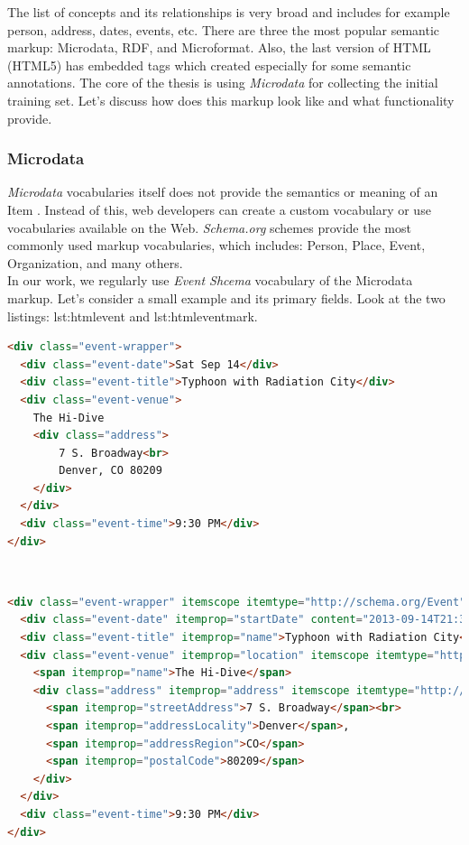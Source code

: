 The list of concepts and its relationships is very broad and includes for example person, address, dates, events, etc. There are three the most popular semantic markup: Microdata, RDF, and Microformat. Also, the last version of HTML (HTML5) has embedded tags which created especially for some semantic annotations. The core of the thesis is using \textit{Microdata} for collecting the initial training set. Let's discuss how does this markup look like and what functionality provide.\\

\subsubsection*{Microdata}
\label{subsubsec:microdata}
\textit{Microdata} vocabularies itself does not provide the semantics or meaning of an Item \cite{Microdata}. Instead of this, web developers can create a custom vocabulary or use vocabularies available on the Web. \textit{Schema.org} schemes provide the most commonly used markup vocabularies, which includes: Person, Place, Event, Organization, and many others. \\

In our work, we regularly use \textit{Event Shcema} vocabulary of the Microdata markup. Let's consider a small example and its primary fields. Look at the two listings: {lst:htmlevent} and {lst:htmleventmark}.\\

\begin{lstlisting}[language=html, caption={Event information without semantic markup}, label={lst:htmlevent}, captionpos=b]
<div class="event-wrapper">
  <div class="event-date">Sat Sep 14</div>
  <div class="event-title">Typhoon with Radiation City</div>
  <div class="event-venue">
    The Hi-Dive
    <div class="address">
        7 S. Broadway<br>
        Denver, CO 80209
    </div>
  </div>
  <div class="event-time">9:30 PM</div>
</div>

\end{lstlisting}
\\

\begin{lstlisting}[language=html, caption={Event information annotated with Microdata}, label={lst:htmleventmark}, captionpos=b]
<div class="event-wrapper" itemscope itemtype="http://schema.org/Event">
  <div class="event-date" itemprop="startDate" content="2013-09-14T21:30">Sat Sep 14</div>
  <div class="event-title" itemprop="name">Typhoon with Radiation City</div>
  <div class="event-venue" itemprop="location" itemscope itemtype="http://schema.org/Place">
    <span itemprop="name">The Hi-Dive</span>
    <div class="address" itemprop="address" itemscope itemtype="http://schema.org/PostalAddress">
      <span itemprop="streetAddress">7 S. Broadway</span><br>
      <span itemprop="addressLocality">Denver</span>,
      <span itemprop="addressRegion">CO</span>
      <span itemprop="postalCode">80209</span>
    </div>
  </div>
  <div class="event-time">9:30 PM</div>
</div>

\end{lstlisting}\\


